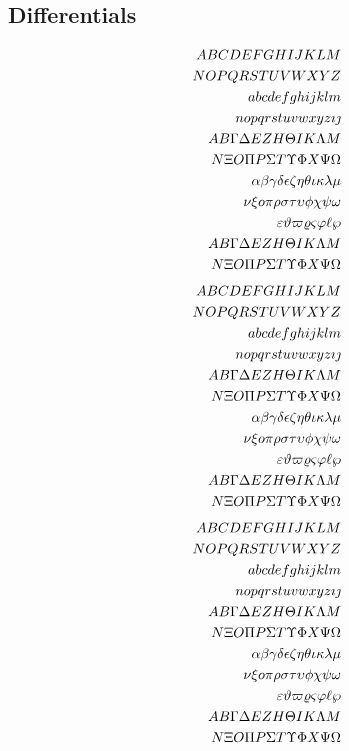 \documentclass{article}
\def\test#1{#1}
\def\testupperi{%
  \test A \test B \test C \test D \test E \test F \test G \test H
  \test I \test J \test K \test L \test M }
\def\testupperii{%
  \test N \test O \test P \test Q \test R \test S \test T \test U
  \test V \test W \test X \test Y \test Z }
\def\testloweri{%
  \test a \test b \test c \test d \test e \test f \test g \test h
  \test i \test j \test k \test l \test m }
\def\testlowerii{%
  \test n \test o \test p \test q \test r \test s \test t \test u
  \test v \test w \test x \test y \test z 
  \test\imath \test\jmath }
\def\testupgreeki{%
  \test A \test B \test\Gamma \test\Delta \test E \test Z \test H
  \test\Theta \test I \test K \test\Lambda \test M }
\def\testupgreekii{%
  \test N \test\Xi \test O \test\Pi \test P \test\Sigma \test T
  \test\Upsilon \test\Phi \test X \test\Psi \test\Omega 
}
\def\testlowgreeki{%
  \test\alpha \test\beta \test\gamma \test\delta \test\epsilon
  \test\zeta \test\eta \test\theta \test\iota \test\kappa \test\lambda
  \test\mu }
\def\testlowgreekii{%
  \test\nu \test\xi \test o \test\pi \test\rho \test\sigma \test\tau
  \test\upsilon \test\phi \test\chi \test\psi \test\omega }
\def\testlowgreekiii{%
  \test\varepsilon \test\vartheta \test\varpi \test\varrho
  \test\varsigma \test\varphi \test\ell \test\wp}
\begin{document}
\clearpage
\subsection{Differentials}

\begin{eqnarray*}
\gdef\test#1{\dit #1+}%
  && {\testupperi}\\
  && {\testupperii}\\
  && {\testloweri}\\ 
  && {\testlowerii}\\ 
  && {\testupgreeki}\\
  && {\testupgreekii}\\
  && {\testlowgreeki}\\
  && {\testlowgreekii}\\
  && {\testlowgreekiii}\\
\gdef\test#1{\dit \mathrm{#1}+}%
  && {\testupgreeki}\\
  && {\testupgreekii}
\end{eqnarray*}%
%
\begin{eqnarray*}
\gdef\test#1{\dup #1+}%
  && {\testupperi}\\
  && {\testupperii}\\
  && {\testloweri}\\ 
  && {\testlowerii}\\ 
  && {\testupgreeki}\\
  && {\testupgreekii}\\
  && {\testlowgreeki}\\
  && {\testlowgreekii}\\
  && {\testlowgreekiii}\\
\gdef\test#1{\dup \mathrm{#1}+}%
  && {\testupgreeki}\\
  && {\testupgreekii}
\end{eqnarray*}%
%
\begin{eqnarray*}
\gdef\test#1{\partial #1+}%
  && {\testupperi}\\
  && {\testupperii}\\
  && {\testloweri}\\ 
  && {\testlowerii}\\ 
  && {\testupgreeki}\\
  && {\testupgreekii}\\
  && {\testlowgreeki}\\
  && {\testlowgreekii}\\
  && {\testlowgreekiii}\\
\gdef\test#1{\partial \mathrm{#1}+}%
  && {\testupgreeki}\\
  && {\testupgreekii}
\end{eqnarray*}%
\end{document}

